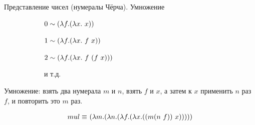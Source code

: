\begin{frame}{Представление чисел (нумералы Чёрча). Умножение}
\begin{figure}[t]
    \begin{subfigure}[t]{0.35\textwidth}
$ 0 \sim (\lambda f . (\lambda x . \ x))$

$ 1 \sim (\lambda f . (\lambda x . \ f\ x))$

$ 2 \sim (\lambda f . (\lambda x . \ f\ (f\ x)))$

  и т.д.
    \end{subfigure}
    \begin{subfigure}[t]{0.55\textwidth}
    \begin{minipage}{\textwidth}
    \numeralIsFor
    \end{minipage}
    \end{subfigure}
\end{figure}

  \vspace{1cm}


Умножение: взять два нумерала $m$ и $n$, взять $f$ и $x$, а затем к $x$ применить $n$ раз $f$, и повторить это $m$ раз.

{\Large \begin{align*}
mul \equiv &\ (\lambda m . (\lambda n . (\lambda f . (\lambda x . ((m (n\ f )){\ x} )))))\\
\end{align*}}
\end{frame}




